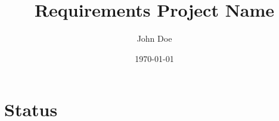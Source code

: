 \documentclass{report}
\begin{document}
\thispagestyle{empty}

\title{Requirements Project Name}
\author{John Doe}
\date{\today}
\maketitle
\newpage

\tableofcontents
\newpage



\appendix
\chapter{Status}

\end{document}
